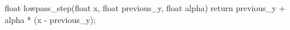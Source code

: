 \begin{notecode}[language=C,numbers=left]
float lowpass_step(float x, float previous_y, float alpha)
{
    return previous_y + alpha * (x - previous_y);
}
\end{notecode}
